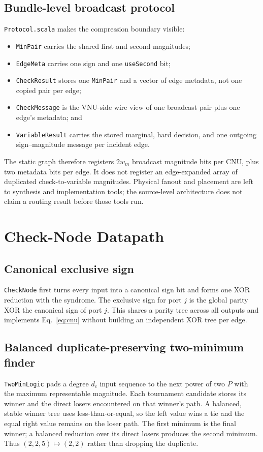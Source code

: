 \documentclass[10pt,conference]{IEEEtran}
\begin{document}
\subsection{Bundle-level broadcast protocol}
\texttt{Protocol.scala} makes the compression boundary visible:
\begin{itemize}
  \item \texttt{MinPair} carries the shared first and second magnitudes;
  \item \texttt{EdgeMeta} carries one sign and one \texttt{useSecond} bit;
  \item \texttt{CheckResult} stores one \texttt{MinPair} and a vector of edge
        metadata, not one copied pair per edge;
  \item \texttt{CheckMessage} is the VNU-side wire view of one broadcast pair
        plus one edge's metadata; and
  \item \texttt{VariableResult} carries the stored marginal, hard decision,
        and one outgoing sign--magnitude message per incident edge.
\end{itemize}
The static graph therefore registers $2w_m$ broadcast magnitude bits per CNU,
plus two metadata bits per edge.  It does not register an edge-expanded array
of duplicated check-to-variable magnitudes.  Physical fanout and placement are
left to synthesis and implementation tools; the source-level architecture does
not claim a routing result before those tools run.

\section{Check-Node Datapath}
\subsection{Canonical exclusive sign}
\texttt{CheckNode} first turns every input into a canonical sign bit and forms
one XOR reduction with the syndrome.  The exclusive sign for port $j$ is the
global parity XOR the canonical sign of port $j$.  This shares a parity tree
across all outputs and implements Eq.~\eqref{eq:cnu} without building an
independent XOR tree per edge.

\subsection{Balanced duplicate-preserving two-minimum finder}
\texttt{TwoMinLogic} pads a degree $d_c$ input sequence to the next power of two
$P$ with the maximum representable magnitude.  Each tournament candidate
stores its winner and the direct losers encountered on that winner's path.  A
balanced, stable winner tree uses less-than-or-equal, so the left value wins a
tie and the equal right value remains on the loser path.  The first minimum is
the final winner; a balanced reduction over its direct losers produces the
second minimum.  Thus $(2,2,5)\mapsto(2,2)$ rather than dropping the duplicate.
\end{document}
